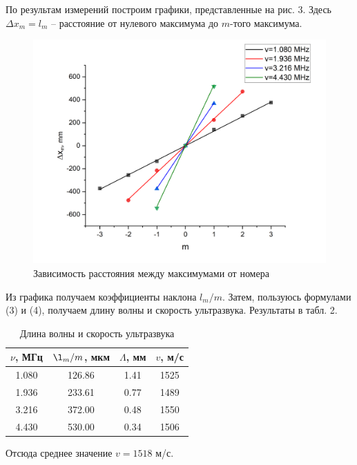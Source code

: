 \documentclass[a4paper,12pt]{article}
\begin{document}
\noindent
По результам измерений построим графики, представленные на рис. 3. Здесь $\Delta x_m = l_m$ -- расстояние от нулевого максимума до $m$-того максимума.

\begin{figure}[H]
    \centering
    \includegraphics[scale=0.55]{1.png}
    \caption{Зависимость расстояния между максимумами от номера}
\end{figure}

\noindent
Из графика получаем коэффициенты наклона $l_m / m$. Затем, пользуюсь формулами (3) и (4), получаем длину волны и скорость ультразвука. Результаты в табл. 2.

\begin{table}[H]
    \centering
    \caption{Длина волны и скорость ультразвука}
    \begin{tabular}{|c|c|c|c|} \hline
        $\nu$, МГц & $\l_m / m$, мкм & $\Lambda$, мм & $v$, м/с  \\ \hline
        1.080 & 126.86 & 1.41 & 1525 \\ \hline
        1.936 & 233.61 & 0.77 & 1489 \\ \hline
        3.216 & 372.00 & 0.48 & 1550 \\ \hline
        4.430 & 530.00 & 0.34 & 1506\\ \hline
    \end{tabular}
\end{table}

\noindent
Отсюда среднее значение $v = 1518$ м/с.
\end{document}
